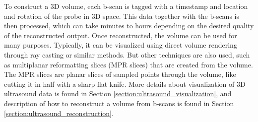 To construct a 3D volume, each b-scan is tagged with a timestamp and location and rotation of the probe in 3D space. This data together with the b-scans is then processed, which can take minutes to hours depending on the desired quality of the reconstructed output. Once reconstructed, the volume can be used for many purposes. Typically, it can be visualized using direct volume rendering through ray casting or similar methods. But other techniques are also used, such as multiplanar reformatting slices (MPR slices) that are created from the volume. The MPR slices are planar slices of sampled points through the volume, like cutting it in half with a sharp flat knife. More details about visualization of 3D ultrasound data is found in Section \ref{section:ultrasound_visualization}, and description of how to reconstruct a volume from b-scans is found in Section \ref{section:ultrasound_reconstruction}.